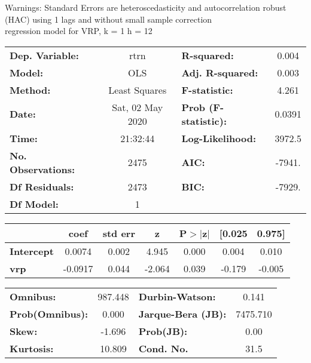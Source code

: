 Warnings: \newline
 [1] Standard Errors are heteroscedasticity and autocorrelation robust (HAC) using 1 lags and without small sample correction\\ 

regression model for VRP, k = 1 h = 12\begin{center}
\begin{tabular}{lclc}
\toprule
\textbf{Dep. Variable:}    &       rtrn       & \textbf{  R-squared:         } &     0.004   \\
\textbf{Model:}            &       OLS        & \textbf{  Adj. R-squared:    } &     0.003   \\
\textbf{Method:}           &  Least Squares   & \textbf{  F-statistic:       } &     4.261   \\
\textbf{Date:}             & Sat, 02 May 2020 & \textbf{  Prob (F-statistic):} &   0.0391    \\
\textbf{Time:}             &     21:32:44     & \textbf{  Log-Likelihood:    } &    3972.5   \\
\textbf{No. Observations:} &        2475      & \textbf{  AIC:               } &    -7941.   \\
\textbf{Df Residuals:}     &        2473      & \textbf{  BIC:               } &    -7929.   \\
\textbf{Df Model:}         &           1      & \textbf{                     } &             \\
\bottomrule
\end{tabular}
\begin{tabular}{lcccccc}
                   & \textbf{coef} & \textbf{std err} & \textbf{z} & \textbf{P$> |$z$|$} & \textbf{[0.025} & \textbf{0.975]}  \\
\midrule
\textbf{Intercept} &       0.0074  &        0.002     &     4.945  &         0.000        &        0.004    &        0.010     \\
\textbf{vrp}       &      -0.0917  &        0.044     &    -2.064  &         0.039        &       -0.179    &       -0.005     \\
\bottomrule
\end{tabular}
\begin{tabular}{lclc}
\textbf{Omnibus:}       & 987.448 & \textbf{  Durbin-Watson:     } &    0.141  \\
\textbf{Prob(Omnibus):} &   0.000 & \textbf{  Jarque-Bera (JB):  } & 7475.710  \\
\textbf{Skew:}          &  -1.696 & \textbf{  Prob(JB):          } &     0.00  \\
\textbf{Kurtosis:}      &  10.809 & \textbf{  Cond. No.          } &     31.5  \\
\bottomrule
\end{tabular}
\end{center}

